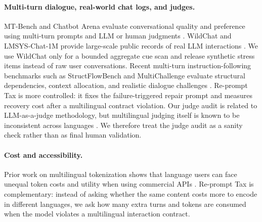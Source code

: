 \paragraph{Multi-turn dialogue, real-world chat logs, and judges.}
MT-Bench and Chatbot Arena evaluate conversational quality and preference using
multi-turn prompts and LLM or human judgments \citep{zheng2023mtbench}. WildChat
and LMSYS-Chat-1M provide large-scale public records of real LLM interactions
\citep{zhao2024wildchat,zheng2023lmsyschat1m}. We use WildChat only for a
bounded aggregate cue scan and release synthetic stress items instead of raw
user conversations. Recent multi-turn instruction-following benchmarks such as
StructFlowBench and MultiChallenge evaluate structural dependencies, context
allocation, and realistic dialogue challenges
\citep{li2025structflowbench,sirdeshmukh2025multichallenge}. Re-prompt Tax is
more controlled: it fixes the failure-triggered repair prompt and measures
recovery cost after a multilingual contract violation. Our judge audit is
related to LLM-as-a-judge methodology, but multilingual judging itself is known
to be inconsistent across languages \citep{fu2025multilingualjudge}. We
therefore treat the judge audit as a sanity check rather than as final human
validation.

\paragraph{Cost and accessibility.}
Prior work on multilingual tokenization shows that language users can face
unequal token costs and utility when using commercial APIs
\citep{ahia2023languagecost,petrov2023tokenizers}. Re-prompt Tax is
complementary: instead of asking whether the same content costs more to encode
in different languages, we ask how many extra turns and tokens are consumed when
the model violates a multilingual interaction contract.
